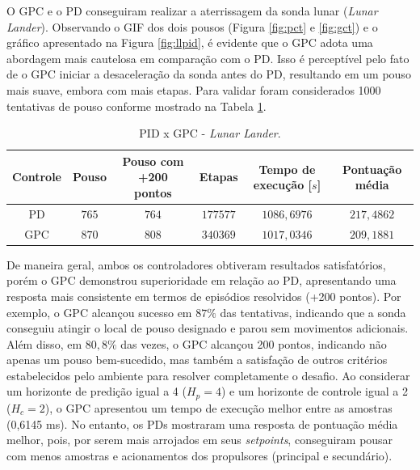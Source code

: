 \documentclass[12pt,           %
a4paper,                       %
openany,                       %
oneside,                       %
chapter=TITLE,                 %
english,                       %
spanish,                       %
brazil,                        %
sumario=tradicional]{abntex2}  %
\begin{document}
\begin{OnehalfSpace}
O GPC e o PD conseguiram realizar a aterrissagem da sonda lunar (\textit{Lunar Lander}). Observando o GIF dos dois pousos (Figura \ref{fig:pct} e \ref{fig:gct}) e o gráfico apresentado na Figura \ref{fig:llpid}, é evidente que o GPC adota uma abordagem mais cautelosa em comparação com o PD. Isso é perceptível pelo fato de o GPC iniciar a desaceleração da sonda antes do PD, resultando em um pouso mais suave, embora com mais etapas. Para validar foram considerados 1000 tentativas de pouso conforme mostrado na Tabela \ref{tab:outll}.

\begin{table}[H]
	\centering
	\vspace*{-.2cm}
	\caption{PID x GPC - \textit{Lunar Lander}.}
	\begin{tabular}{|c|c|c|c|c|c|}
			\hline
             Controle & Pouso & Pouso com +200 pontos & Etapas & Tempo de execução [$s$] & Pontuação média\\
            \hline
            PD & $765$ & $764$ &  $177577$ & $1086,6976$ & $217,4862$\\
            \hline
            GPC & $870$ & $808$  &  $340369$ & $1017,0346$ & $209,1881$\\ 
            \hline
	\end{tabular}  
    \label{tab:outll}                 %
\end{table}
\vspace*{-0.7cm}
{\raggedright {}}

De maneira geral, ambos os controladores obtiveram resultados satisfatórios, porém o GPC demonstrou superioridade em relação ao PD, apresentando uma resposta mais consistente em termos de episódios resolvidos (+200 pontos). Por exemplo, o GPC alcançou sucesso em $87\%$ das tentativas, indicando que a sonda conseguiu atingir o local de pouso designado e parou sem movimentos adicionais. Além disso, em $80,8\%$ das vezes, o GPC alcançou 200 pontos, indicando não apenas um pouso bem-sucedido, mas também a satisfação de outros critérios estabelecidos pelo ambiente para resolver completamente o desafio. Ao considerar um horizonte de predição igual a 4 ($H_p=4$) e um horizonte de controle igual a 2 ($H_c=2$), o GPC apresentou um tempo de execução melhor entre as amostras (0,6145 ms). No entanto, os PDs mostraram uma resposta de pontuação média melhor, pois, por serem mais arrojados em seus \textit{setpoints}, conseguiram pousar com menos amostras e acionamentos dos propulsores (principal e secundário).


\end{OnehalfSpace}
\end{document}
